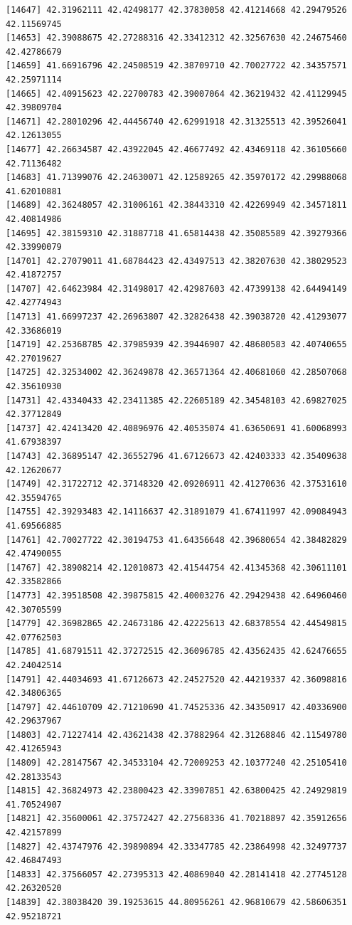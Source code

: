 \documentclass[
  letterpaper,
  DIV=11,
  numbers=noendperiod]{scrartcl}
\begin{document}
\begin{verbatim}
[14647] 42.31962111 42.42498177 42.37830058 42.41214668 42.29479526 42.11569745
[14653] 42.39088675 42.27288316 42.33412312 42.32567630 42.24675460 42.42786679
[14659] 41.66916796 42.24508519 42.38709710 42.70027722 42.34357571 42.25971114
[14665] 42.40915623 42.22700783 42.39007064 42.36219432 42.41129945 42.39809704
[14671] 42.28010296 42.44456740 42.62991918 42.31325513 42.39526041 42.12613055
[14677] 42.26634587 42.43922045 42.46677492 42.43469118 42.36105660 42.71136482
[14683] 41.71399076 42.24630071 42.12589265 42.35970172 42.29988068 41.62010881
[14689] 42.36248057 42.31006161 42.38443310 42.42269949 42.34571811 42.40814986
[14695] 42.38159310 42.31887718 41.65814438 42.35085589 42.39279366 42.33990079
[14701] 42.27079011 41.68784423 42.43497513 42.38207630 42.38029523 42.41872757
[14707] 42.64623984 42.31498017 42.42987603 42.47399138 42.64494149 42.42774943
[14713] 41.66997237 42.26963807 42.32826438 42.39038720 42.41293077 42.33686019
[14719] 42.25368785 42.37985939 42.39446907 42.48680583 42.40740655 42.27019627
[14725] 42.32534002 42.36249878 42.36571364 42.40681060 42.28507068 42.35610930
[14731] 42.43340433 42.23411385 42.22605189 42.34548103 42.69827025 42.37712849
[14737] 42.42413420 42.40896976 42.40535074 41.63650691 41.60068993 41.67938397
[14743] 42.36895147 42.36552796 41.67126673 42.42403333 42.35409638 42.12620677
[14749] 42.31722712 42.37148320 42.09206911 42.41270636 42.37531610 42.35594765
[14755] 42.39293483 42.14116637 42.31891079 41.67411997 42.09084943 41.69566885
[14761] 42.70027722 42.30194753 41.64356648 42.39680654 42.38482829 42.47490055
[14767] 42.38908214 42.12010873 42.41544754 42.41345368 42.30611101 42.33582866
[14773] 42.39518508 42.39875815 42.40003276 42.29429438 42.64960460 42.30705599
[14779] 42.36982865 42.24673186 42.42225613 42.68378554 42.44549815 42.07762503
[14785] 41.68791511 42.37272515 42.36096785 42.43562435 42.62476655 42.24042514
[14791] 42.44034693 41.67126673 42.24527520 42.44219337 42.36098816 42.34806365
[14797] 42.44610709 42.71210690 41.74525336 42.34350917 42.40336900 42.29637967
[14803] 42.71227414 42.43621438 42.37882964 42.31268846 42.11549780 42.41265943
[14809] 42.28147567 42.34533104 42.72009253 42.10377240 42.25105410 42.28133543
[14815] 42.36824973 42.23800423 42.33907851 42.63800425 42.24929819 41.70524907
[14821] 42.35600061 42.37572427 42.27568336 41.70218897 42.35912656 42.42157899
[14827] 42.43747976 42.39890894 42.33347785 42.23864998 42.32497737 42.46847493
[14833] 42.37566057 42.27395313 42.40869040 42.28141418 42.27745128 42.26320520
[14839] 42.38038420 39.19253615 44.80956261 42.96810679 42.58606351 42.95218721

\end{verbatim}
\end{document}

